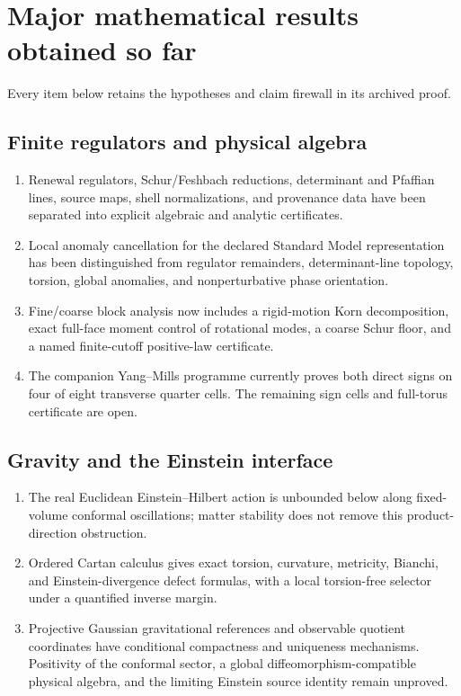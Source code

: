 \documentclass[11pt]{article}
\theoremstyle{remark}
\begin{document}
\section{Major mathematical results obtained so far}
\label{sec:v17v1-summary}

Every item below retains the hypotheses and claim firewall in its
archived proof.

\subsection{Finite regulators and physical algebra}

\begin{enumerate}[leftmargin=2.2em]
\item Renewal regulators, Schur/Feshbach reductions, determinant and
      Pfaffian lines, source maps, shell normalizations, and
      provenance data have been separated into explicit algebraic
      and analytic certificates.
\item Local anomaly cancellation for the declared Standard Model
      representation has been distinguished from regulator
      remainders, determinant-line topology, torsion, global
      anomalies, and nonperturbative phase orientation.
\item Fine/coarse block analysis now includes a rigid-motion Korn
      decomposition, exact full-face moment control of rotational
      modes, a coarse Schur floor, and a named finite-cutoff
      positive-law certificate.
\item The companion Yang--Mills programme currently proves both
      direct signs on four of eight transverse quarter cells.  The
      remaining sign cells and full-torus certificate are open.
\end{enumerate}

\subsection{Gravity and the Einstein interface}

\begin{enumerate}[leftmargin=2.2em]
\item The real Euclidean Einstein--Hilbert action is unbounded below
      along fixed-volume conformal oscillations; matter stability
      does not remove this product-direction obstruction.
\item Ordered Cartan calculus gives exact torsion, curvature,
      metricity, Bianchi, and Einstein-divergence defect formulas,
      with a local torsion-free selector under a quantified inverse
      margin.
\item Projective Gaussian gravitational references and observable
      quotient coordinates have conditional compactness and
      uniqueness mechanisms.  Positivity of the conformal sector,
      a global diffeomorphism-compatible physical algebra, and the
      limiting Einstein source identity remain unproved.
\end{enumerate}
\end{document}
